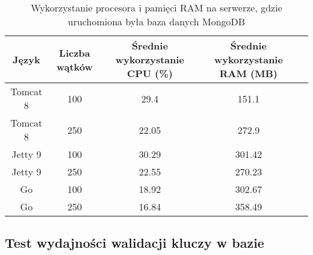 \begin{table}[!htb]
\centering
\caption{Wykorzystanie procesora i pamięci RAM na serwerze, gdzie uruchomiona była baza danych MongoDB}
\label{tab:mongo-clean-api}
\begin{tabular}{@{}ccccl@{}}
\toprule
\textbf{Język} & \textbf{Liczba wątków} & \multicolumn{1}{p{3cm}}{\textbf{Średnie wykorzystanie CPU (\%)}} & \multicolumn{1}{p{3cm}}{\textbf{Średnie wykorzystanie RAM (MB)}} &  \\ \midrule
Tomcat 8       & 100                    & 29.4                             & 151.1                          &  \\
Tomcat 8       & 250                    & 22.05                             & 272.9                          &  \\
Jetty 9       & 100                    & 30.29                             & 301.42                          &  \\
Jetty 9       & 250                    & 22.55                             & 270.23                          &  \\
Go       & 100                    & 18.92                             & 302.67                          &  \\
Go       & 250                    & 16.84                             & 358.49                          &  \\
\bottomrule
\end{tabular}
\end{table}

 \newpage
 \subsection{Test wydajności walidacji kluczy w bazie}

 \clearpage

